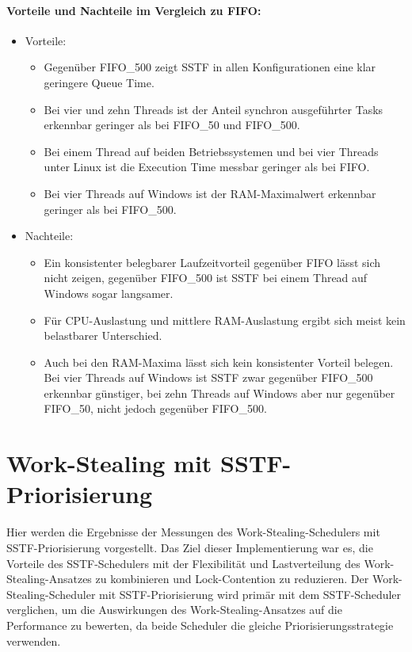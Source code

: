 \begin{sloppypar}
\paragraph{Vorteile und Nachteile im Vergleich zu \acs{FIFO}:}
\begin{itemize}
    \item Vorteile:
    \begin{itemize}
        \item Gegenüber \acs{FIFO}\_500 zeigt \acs{SSTF} in allen Konfigurationen eine klar geringere Queue Time.
        \item Bei vier und zehn Threads ist der Anteil synchron ausgeführter Tasks erkennbar geringer als bei \acs{FIFO}\_50 und \acs{FIFO}\_500.
        \item Bei einem Thread auf beiden Betriebssystemen und bei vier Threads unter Linux ist die Execution Time messbar geringer als bei \acs{FIFO}.
        \item Bei vier Threads auf Windows ist der \acs{RAM}-Maximalwert erkennbar geringer als bei \acs{FIFO}\_500.
    \end{itemize}
    \item Nachteile:
    \begin{itemize}
        \item Ein konsistenter belegbarer Laufzeitvorteil gegenüber \acs{FIFO} lässt sich nicht zeigen, gegenüber \acs{FIFO}\_500 ist \acs{SSTF} bei einem Thread auf Windows sogar langsamer.
        \item Für \acs{CPU}-Auslastung und mittlere \acs{RAM}-Auslastung ergibt sich meist kein belastbarer Unterschied.
        \item Auch bei den \acs{RAM}-Maxima lässt sich kein konsistenter Vorteil belegen. Bei vier Threads auf Windows ist \acs{SSTF} zwar gegenüber \acs{FIFO}\_500 erkennbar günstiger, bei zehn Threads auf Windows aber nur gegenüber \acs{FIFO}\_50, nicht jedoch gegenüber \acs{FIFO}\_500.
    \end{itemize}
\end{itemize}

\section{Work-Stealing mit \acs{SSTF}-Priorisierung}
Hier werden die Ergebnisse der Messungen des Work-Stealing-Schedulers mit \acs{SSTF}-Priorisierung vorgestellt.
Das Ziel dieser Implementierung war es, die Vorteile des \acs{SSTF}-Schedulers mit der Flexibilität und Lastverteilung des Work-Stealing-Ansatzes zu kombinieren und Lock-Contention zu reduzieren.
Der Work-Stealing-Scheduler mit \acs{SSTF}-Priorisierung wird primär mit dem \acs{SSTF}-Scheduler verglichen, 
um die Auswirkungen des Work-Stealing-Ansatzes auf die Performance zu bewerten, 
da beide Scheduler die gleiche Priorisierungsstrategie verwenden.


\end{sloppypar}
